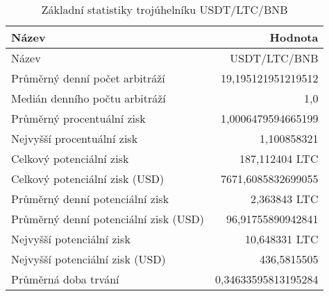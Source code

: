 \begin{table}\centering
\caption{Základní statistiky trojúhelníku USDT/LTC/BNB}
\label{USDTLTCBNB_stats}
\begin{tabular}{|| l | r ||}
\hline Název & Hodnota \\ 
\hline\hline Název & USDT/LTC/BNB \\ 
\hline Průměrný denní počet arbitráží & 19,195121951219512 \\ 
\hline Medián denního počtu arbitráží & 1,0 \\ 
\hline Průměrný procentuální zisk & 1,0006479594665199 \\ 
\hline Nejvyšší procentuální zisk & 1,100858321 \\ 
\hline Celkový potenciální zisk & 187,112404 LTC \\ 
\hline Celkový potenciální zisk (USD) & 7671,6085832699055 \\ 
\hline Průměrný denní potenciální zisk & 2,363843 LTC \\ 
\hline Průměrný denní potenciální zisk (USD) & 96,91755890942841 \\ 
\hline Nejvyšší potenciální zisk & 10,648331 LTC \\ 
\hline Nejvyšší potenciální zisk (USD) & 436,5815505 \\ 
\hline Průměrná doba trvání & 0,34633595813195284 \\ 
\hline
\end{tabular}
\end{table}